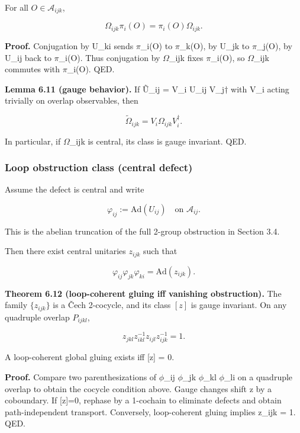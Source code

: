 For all \(O \in \mathcal{A}_{ijk}\),

\[
\Omega_{ijk} \pi_i(O) = \pi_i(O) \Omega_{ijk}.
\]

\textbf{Proof.} Conjugation by U\_ki sends \ensuremath{\pi}\_i(O) to \ensuremath{\pi}\_k(O), by U\_jk to \ensuremath{\pi}\_j(O), by U\_ij back to \ensuremath{\pi}\_i(O). Thus conjugation by \ensuremath{\Omega}\_ijk fixes \ensuremath{\pi}\_i(O), so \ensuremath{\Omega}\_ijk commutes with \ensuremath{\pi}\_i(O). QED.

\textbf{Lemma 6.11 (gauge behavior).} If \~{U}\_ij = V\_i U\_ij V\_j\ensuremath{\dagger} with V\_i acting trivially on overlap observables, then

\[
\tilde{\Omega}_{ijk} = V_i \Omega_{ijk} V_i^\dagger.
\]

In particular, if \ensuremath{\Omega}\_ijk is central, its class is gauge invariant. QED.

\subsubsection{Loop obstruction class (central defect)}\label{66-loop-obstruction-class-central-defect}

Assume the defect is central and write

\[
\varphi_{ij} := \mathrm{Ad}(U_{ij}) \quad \text{on } \mathcal{A}_{ij}.
\]

This is the abelian truncation of the full 2-group obstruction in Section 3.4.

Then there exist central unitaries \(z_{ijk}\) such that

\[
\varphi_{ij} \varphi_{jk} \varphi_{ki} = \mathrm{Ad}(z_{ijk}).
\]

\textbf{Theorem 6.12 (loop-coherent gluing iff vanishing obstruction).} The family \(\{z_{ijk}\}\) is a \v{C}ech 2-cocycle, and its class \([z]\) is gauge invariant. On any quadruple overlap \(P_{ijkl}\),

\[
z_{jkl} z_{ikl}^{-1} z_{ijl} z_{ijk}^{-1} = 1.
\]

A loop-coherent global gluing exists iff {[}z{]} = 0.

\textbf{Proof.} Compare two parenthesizations of \ensuremath{\phi}\_ij \ensuremath{\phi}\_jk \ensuremath{\phi}\_kl \ensuremath{\phi}\_li on a quadruple overlap to obtain the cocycle condition above. Gauge changes shift z by a coboundary. If {[}z{]}=0, rephase by a 1-cochain to eliminate defects and obtain path-independent transport. Conversely, loop-coherent gluing implies z\_ijk = 1. QED.

